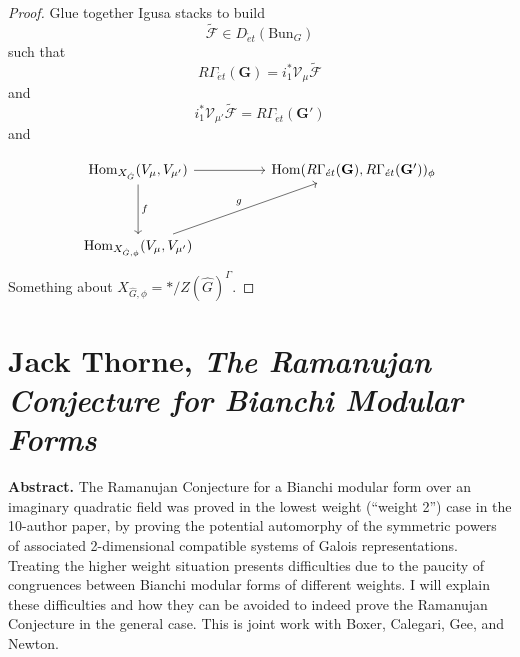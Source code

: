 \documentclass[reqno]{amsart} 
\begin{document}
\begin{proof}
  Glue together Igusa stacks to build
  \begin{equation*}
    \tilde{\mathcal{F}}
    \in D_{\acute{e}t}(\mathrm{Bun}_G)
  \end{equation*}
  such that
  \begin{equation*}
    R \Gamma_{\acute{e}t}(\mathbf{G}) = i_1^\ast
    \mathcal{V}_\mu  \tilde{\mathcal{F}}
  \end{equation*}
  and
  \begin{equation*}
    i_1^\ast \mathcal{V}_{\mu '} \tilde{\mathcal{F}} =
    R \Gamma_{\acute{e}t}(\mathbf{G} ')
  \end{equation*}
  and

  \begin{equation*}
    \begin{tikzcd}
      \Hom_{X_{\hat{G}}}(V_\mu, V_{\mu'}) \arrow[dd, "f"] \arrow[rr] & & \Hom(R \Gamma_{\acute{e}t}(\mathbf{G}), R \Gamma_{\acute{e}t}(\mathbf{G}'))_{\phi} \\
      & & \\
      \Hom_{X_{\hat{G}, \phi}}(V_{\mu}, V_{\mu '}) \arrow[uurr, "g"] & & 
    \end{tikzcd}
  \end{equation*}
  Something about $X_{\hat{G}, \phi} = \ast / Z(\hat{G})^\Gamma$.
\end{proof}

\part{Jack Thorne, \emph{The Ramanujan Conjecture for Bianchi Modular Forms}}

\textbf{Abstract.}  The Ramanujan Conjecture for a Bianchi modular form over an imaginary quadratic field was proved in the lowest weight (“weight 2”) case in the 10-author paper, by proving the potential automorphy of the symmetric powers of associated 2-dimensional compatible systems of Galois representations. Treating the higher weight situation presents difficulties due to the paucity of congruences between Bianchi modular forms of different weights. I will explain these difficulties and how they can be avoided to indeed prove the Ramanujan Conjecture in the general case. This is joint work with Boxer, Calegari, Gee, and Newton.
\end{document}
